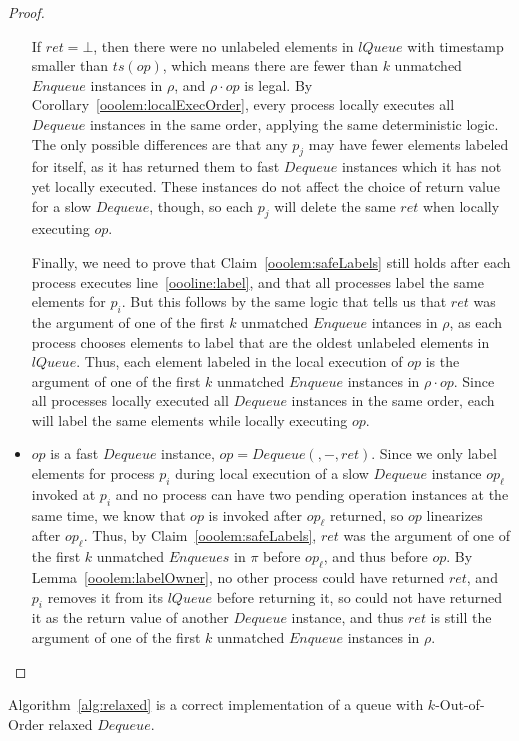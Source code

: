 \documentclass[a4paper,anonymous,USenglish]{lipics-v2021} %
\theoremstyle{definition}
\begin{document}
\begin{proof}
\begin{itemize}
    If $ret = \bot$, then there were no unlabeled elements in $lQueue$ with timestamp smaller than $ts(op)$, which means there are fewer than $k$ unmatched $Enqueue$ instances in $\rho$, and $\rho \cdot op$ is legal.  By Corollary~\ref{ooolem:localExecOrder}, every process locally executes all $Dequeue$ instances in the same order, applying the same deterministic logic.  The only possible differences are that any $p_j$ may have fewer elements labeled for itself, as it has returned them to fast $Dequeue$ instances which it has not yet locally executed.  These instances do not affect the choice of return value for a slow $Dequeue$, though, so each $p_j$ will delete the same $ret$ when locally executing $op$.  

    Finally, we need to prove that Claim~\ref{ooolem:safeLabels} still holds after each process executes line~\ref{oooline:label}, and that all processes label the same elements for $p_i$.  But this follows by the same logic that tells us that $ret$ was the argument of one of the first $k$ unmatched $Enqueue$ intances in $\rho$, as each process chooses elements to label that are the oldest unlabeled elements in $lQueue$.  Thus, each element labeled in the local execution of $op$ is the argument of one of the first $k$ unmatched $Enqueue$ instances in $\rho \cdot op$.  Since all processes locally executed all $Dequeue$ instances in the same order, each will label the same elements while locally executing $op$.
%
  \item $op$ is a fast $Dequeue$ instance, $op = Dequeue(,-,ret)$.  Since we only label elements for process $p_i$ during local execution of a slow $Dequeue$ instance $op_\ell$ invoked at $p_i$ and no process can have two pending operation instances at the same time, we know that $op$ is invoked after $op_\ell$ returned, so $op$ linearizes after $op_\ell$.  Thus, by Claim~\ref{ooolem:safeLabels}, $ret$ was the argument of one of the first $k$ unmatched $Enqueues$ in $\pi$ before $op_\ell$, and thus before $op$.  By Lemma~\ref{ooolem:labelOwner}, no other process could have returned $ret$, and $p_i$ removes it from its $lQueue$ before returning it, so could not have returned it as the return value of another $Dequeue$ instance, and thus $ret$ is still the argument of one of the first $k$ unmatched $Enqueue$ instances in $\rho$.
  \end{itemize}
\end{proof}

\begin{theorem}
  Algorithm~\ref{alg:relaxed} is a correct implementation of a queue with $k$-Out-of-Order relaxed $Dequeue$.
\end{theorem}
\end{document}
